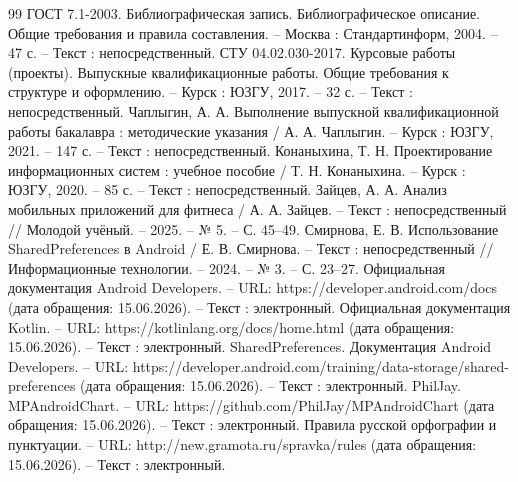\begin{thebibliography}{99}
	 ГОСТ 7.1-2003. Библиографическая запись. Библиографическое описание. Общие требования и правила составления. – Москва : Стандартинформ, 2004. – 47 с. – Текст : непосредственный.
	 СТУ 04.02.030-2017. Курсовые работы (проекты). Выпускные квалификационные работы. Общие требования к структуре и оформлению. – Курск : ЮЗГУ, 2017. – 32 с. – Текст : непосредственный.
	 Чаплыгин, А. А. Выполнение выпускной квалификационной работы бакалавра : методические указания / А. А. Чаплыгин. – Курск : ЮЗГУ, 2021. – 147 с. – Текст : непосредственный.
	 Конаныхина, Т. Н. Проектирование информационных систем : учебное пособие / Т. Н. Конаныхина. – Курск : ЮЗГУ, 2020. – 85 с. – Текст : непосредственный.
	 Зайцев, А. А. Анализ мобильных приложений для фитнеса / А. А. Зайцев. – Текст : непосредственный // Молодой учёный. – 2025. – № 5. – С. 45–49.
	 Смирнова, Е. В. Использование SharedPreferences в Android / Е. В. Смирнова. – Текст : непосредственный // Информационные технологии. – 2024. – № 3. – С. 23–27.
	 Официальная документация Android Developers. – URL: https://developer.android.com/docs (дата обращения: 15.06.2026). – Текст : электронный.
	 Официальная документация Kotlin. – URL: https://kotlinlang.org/docs/home.html (дата обращения: 15.06.2026). – Текст : электронный.
	 SharedPreferences. Документация Android Developers. – URL: https://developer.android.com/training/data-storage/shared-preferences (дата обращения: 15.06.2026). – Текст : электронный.
	 PhilJay. MPAndroidChart. – URL: https://github.com/PhilJay/MPAndroidChart (дата обращения: 15.06.2026). – Текст : электронный.
	 Правила русской орфографии и пунктуации. – URL: http://new.gramota.ru/spravka/rules (дата обращения: 15.06.2026). – Текст : электронный.
\end{thebibliography}
